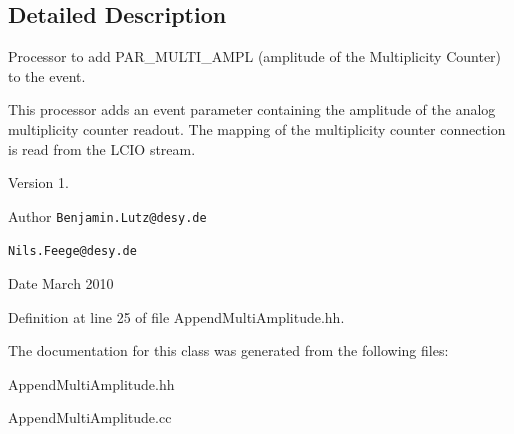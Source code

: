\subsection{Detailed Description}
Processor to add P\-A\-R\-\_\-\-M\-U\-L\-T\-I\-\_\-\-A\-M\-P\-L (amplitude of the Multiplicity Counter) to the event. 

This processor adds an event parameter containing the amplitude of the analog multiplicity counter readout. The mapping of the multiplicity counter connection is read from the L\-C\-I\-O stream.

\begin{DoxyVersion}{Version}
1. 
\end{DoxyVersion}
\begin{DoxyAuthor}{Author}
{\tt Benjamin.\-Lutz@desy.\-de} 

{\tt Nils.\-Feege@desy.\-de} 
\end{DoxyAuthor}
\begin{DoxyDate}{Date}
March 2010 
\end{DoxyDate}


Definition at line 25 of file Append\-Multi\-Amplitude.\-hh.



The documentation for this class was generated from the following files\-:\begin{DoxyCompactItemize}
\item 
Append\-Multi\-Amplitude.\-hh\item 
Append\-Multi\-Amplitude.\-cc\end{DoxyCompactItemize}

